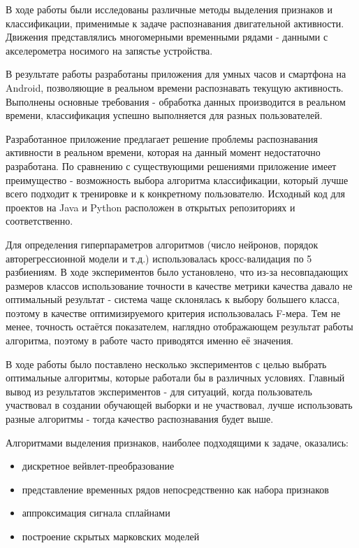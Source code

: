 \conclusion

В ходе работы были исследованы различные методы выделения признаков и классификации, применимые к задаче распознавания двигательной активности. Движения представлялись многомерными временными рядами - данными с акселерометра носимого на запястье устройства.

В результате работы разработаны приложения для умных часов и смартфона на Android, позволяющие в реальном времени распознавать текущую активность. Выполнены основные требования - обработка данных производится в реальном времени, классификация успешно выполняется для разных пользователей. 

Разработанное приложение предлагает решение проблемы распознавания активности в реальном времени, которая на данный момент недостаточно разработана. По сравнению с существующими решениями приложение имеет преимущество - возможность выбора алгоритма классификации, который лучше всего подходит к тренировке и к конкретному пользователю. Исходный код для проектов на Java и Python расположен в открытых репозиториях \cite{repo_java} и \cite{repo_python} соответственно.

Для определения гиперпараметров алгоритмов (число нейронов, порядок авторегрессионной модели и т.д.) использовалась кросс-валидация по 5 разбиениям. В ходе экспериментов было установлено, что из-за несовпадающих размеров классов использование точности в качестве метрики качества давало не оптимальный результат - система чаще склонялась к выбору большего класса, поэтому в качестве оптимизируемого критерия использовалась F-мера. Тем не менее, точность остаётся показателем, наглядно отображающем результат работы алгоритма, поэтому в работе часто приводятся именно её значения.

В ходе работы было поставлено несколько экспериментов с целью выбрать оптимальные алгоритмы, которые работали бы в различных условиях. Главный вывод из результатов экспериментов - для ситуаций, когда пользователь участвовал в создании обучающей выборки и не участвовал, лучше использовать разные алгоритмы - тогда качество распознавания будет выше.

Алгоритмами выделения признаков, наиболее подходящими к задаче, оказались:
\begin{itemize}
\item дискретное вейвлет-преобразование
\item представление временных рядов непосредственно как набора признаков
\item аппроксимация сигнала сплайнами
\item построение скрытых марковских моделей
\end{itemize}


